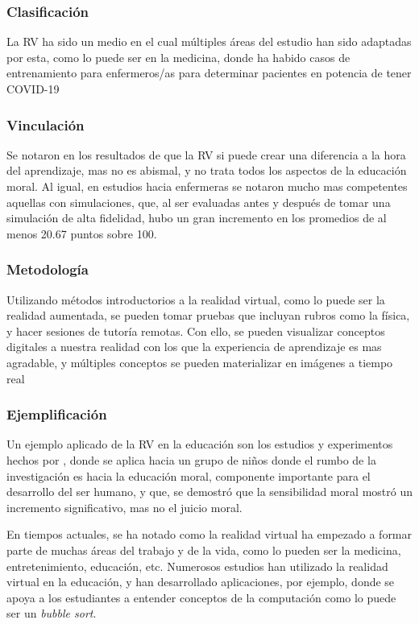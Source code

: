 \subsubsection{Clasificación}

La RV ha sido un medio en el cual múltiples áreas del estudio han sido adaptadas por esta, como lo puede ser en la medicina, donde ha habido casos de entrenamiento para enfermeros/as para determinar pacientes en potencia de tener COVID-19 \parencite{GUERRERO2022100002}

\subsubsection{Vinculación}

Se notaron en los resultados de \textcite{SHIM2023100010} que la RV si puede crear una diferencia a la hora del aprendizaje, mas no es abismal, y no trata todos los aspectos de la educación moral. Al igual, en estudios hacia enfermeras se notaron mucho mas competentes aquellas con simulaciones, que, al ser evaluadas antes y después de tomar una simulación de alta fidelidad, hubo un gran incremento en los promedios de al menos 20.67 puntos sobre 100. \parencite{GUERRERO2022100002}

\subsubsection{Metodología}
Utilizando métodos introductorios a la realidad virtual, como lo puede ser la realidad aumentada, se pueden tomar pruebas que incluyan rubros como la física, y hacer sesiones de tutoría remotas. Con ello, se pueden visualizar conceptos digitales a nuestra realidad con los que la experiencia de aprendizaje es mas agradable, y múltiples conceptos se pueden materializar en imágenes a tiempo real \parencite{RADU2023100011}



\subsubsection{Ejemplificación}

Un ejemplo aplicado de la RV en la educación son los estudios y experimentos hechos por \textcite{SHIM2023100010}, donde se aplica hacia un grupo de niños donde el rumbo de la investigación es hacia la educación moral, componente importante para el desarrollo del ser humano, y que, se demostró que la sensibilidad moral mostró un incremento significativo, mas no el juicio moral.

En tiempos actuales, se ha notado como la realidad virtual ha empezado a formar parte de muchas áreas del trabajo y de la vida, como lo pueden ser la medicina, entretenimiento, educación, etc. Numerosos estudios han utilizado la realidad virtual en la educación, y han desarrollado aplicaciones, por ejemplo, donde se apoya a los estudiantes a entender conceptos de la computación como lo puede ser un \textit{bubble sort}. \parencite{OYELERE2023100016} 
